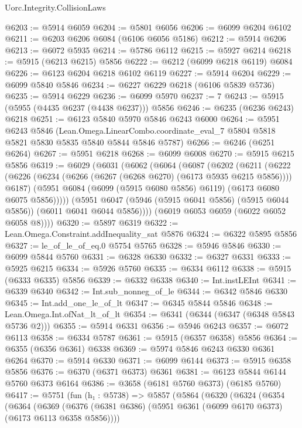 \begin{lexlean}{Uorc.Integrity.CollisionLaws}
\begin{coremodule}
@6203 := @5914 @6059
@6204 := @5801 @6056
@6206 := @6099 @6204 @6102
@6211 := @6203 @6206 @6084 (@6106 @6056 @5186)
@6212 := @5914 @6206
@6213 := @6072 @5935
@6214 := @5786 @6112
@6215 := @5927 @6214
@6218 := @5915 (@6213 @6215) @5856
@6222 := @6212 (@6099 @6218 @6119) @6084
@6226 := @6123 @6204 @6218 @6102 @6119
@6227 := @5914 @6204
@6229 := @6099 @5840 @5846
@6234 := @6227 @6229 @6218 (@6106 @5839 @5736)
@6235 := @5914 @6229
@6236 := @6099 @5970
@6237 := 7
@6243 := @5915 (@5955 (@4435 @6237 (@4438 @6237))) @5856
@6246 := @6235 (@6236 @6243) @6218
@6251 := @6123 @5840 @5970 @5846 @6243 @6000
@6264 := @5951
    @6243
    @5846
    (Lean.Omega.LinearCombo.coordinate_eval_7 @5804 @5818 @5821 @5830 @5835 @5840 @5844 @5846 @5787)
@6266 := @6246 (@6251 @6264)
@6267 := @5951 @6218
@6268 := @6099 @6008
@6270 := @5915 @6215 @5856
@6319 := @6029
    (@6031
      (@6062
        (@6064
          (@6087
            (@6202
              (@6211
                (@6222
                  (@6226 (@6234 (@6266 (@6267 (@6268 @6270) (@6173 @5935 @6215 @5856)))) @6187)
                  (@5951 @6084 (@6099 (@5915 @6080 @5856) @6119) (@6173 @6080 @6075 @5856)))))
            (@5951
              @6047
              (@5946 (@5915 @6041 @5856) (@5915 @6044 @5856))
              (@6011 @6041 @6044 @5856))))
        (@6019 @6053 @6059 (@6022 @6052 @6058 @8))))
@6320 := @5897 @6319
@6322 := Lean.Omega.Constraint.addInequality_sat @5876
@6324 := @6322 @5895 @5856
@6327 := le_of_le_of_eq.{0} @5754 @5765
@6328 := @5946 @5846
@6330 := @6099 @5844 @5760
@6331 := @6328 @6330
@6332 := @6327 @6331
@6333 := @5925 @6215
@6334 := @5926 @5760
@6335 := @6334 @6112
@6338 := @5915 (@6333 @6335) @5856
@6339 := @6332 @6338
@6340 := Int.instLEInt
@6341 := @6339 @6340
@6342 := Int.sub_nonneg_of_le
@6344 := @6342 @5846 @6330
@6345 := Int.add_one_le_of_lt
@6347 := @6345 @5844 @5846
@6348 := Lean.Omega.Int.ofNat_lt_of_lt
@6354 := @6341 (@6344 (@6347 (@6348 @5843 @5736 @2)))
@6355 := @5914 @6331
@6356 := @5946 @6243
@6357 := @6072 @6113
@6358 := @6334 @5787
@6361 := @5915 (@6357 @6358) @5856
@6364 := @6355 (@6356 @6361) @6338
@6369 := @5974 @5846 @6243 @6330 @6361 @6264
@6370 := @5914 @6330
@6371 := @6099 @6144
@6373 := @5915 @6358 @5856
@6376 := @6370 (@6371 @6373) @6361
@6381 := @6123 @5844 @6144 @5760 @6373 @6164
@6386 := @3658 (@6181 @5760 @6373) (@6185 @5760)
@6417 := @5751
    (fun (h₁ : @5738) =>
    @5857
      (@5864
        (@6320
          (@6324
            (@6354
              (@6364
                (@6369
                  (@6376 (@6381 @6386) (@5951 @6361 (@6099 @6170 @6373) (@6173 @6113 @6358 @5856))))

\end{coremodule}
\end{lexlean}
